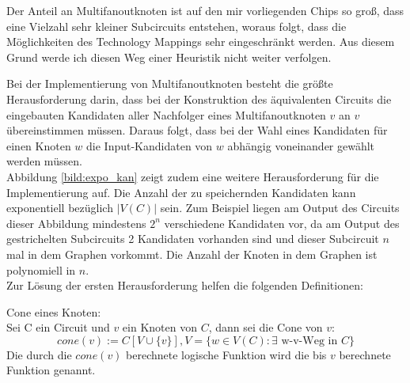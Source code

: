 \documentclass[11pt, a4paper, german]{article}
\begin{document}
 Der Anteil an Multifanoutknoten ist auf den mir vorliegenden Chips so groß, dass eine Vielzahl sehr kleiner Subcircuits entstehen, woraus folgt, dass die Möglichkeiten des Technology Mappings sehr eingeschränkt werden. 
Aus diesem Grund werde ich diesen Weg einer Heuristik nicht weiter verfolgen.

Bei der Implementierung von Multifanoutknoten besteht die größte Herausforderung darin, dass bei der Konstruktion des äquivalenten Circuits die eingebauten Kandidaten aller Nachfolger eines Multifanoutknoten $v$ an $v$ übereinstimmen müssen. Daraus folgt, dass bei der Wahl eines Kandidaten für einen Knoten $w$ die  Input-Kandidaten von $w$ abhängig voneinander gewählt werden müssen. \\

Abbildung \ref{bild:expo_kan} zeigt zudem eine weitere Herausforderung für die Implementierung auf. Die Anzahl der zu speichernden Kandidaten kann  exponentiell bezüglich $|V(C)|$ sein. Zum Beispiel liegen am Output des Circuits dieser Abbildung mindestens $2^n$ verschiedene Kandidaten vor, da am Output des gestrichelten Subcircuits  2 Kandidaten vorhanden sind und dieser Subcircuit $n$ mal in dem Graphen vorkommt. Die Anzahl der Knoten in dem Graphen ist polynomiell in $n$.  \\
Zur Lösung der ersten Herausforderung helfen die folgenden Definitionen:\\

\begin{definition}{Cone eines Knoten:}\\
	Sei C ein Circuit und $v$ ein Knoten von $C$, dann sei die Cone von $v$: 
	\[ cone(v) := C[V \cup \{ v \}], V = \{ w \in V(C) : \exists \text{ w-v-Weg in }  C \} \] 
	Die durch die $cone(v)$ berechnete logische Funktion wird die bis $v$ berechnete Funktion genannt.
\end{definition}
\end{document}
